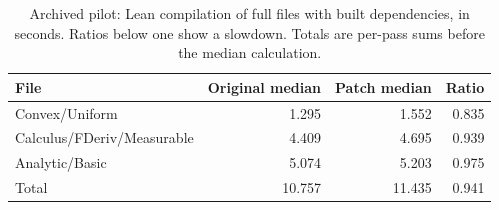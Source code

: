 \begin{table}[t]
\centering\small
\caption{Archived pilot: Lean compilation of full files with built dependencies, in seconds. Ratios below one show a slowdown. Totals are per-pass sums before the median calculation.}
\label{tab:pilot}
\begin{tabular}{lrrr}\toprule
File & Original median & Patch median & Ratio\\\midrule
Convex/Uniform & 1.295 & 1.552 & 0.835\\
Calculus/FDeriv/Measurable & 4.409 & 4.695 & 0.939\\
Analytic/Basic & 5.074 & 5.203 & 0.975\\
Total & 10.757 & 11.435 & 0.941\\\bottomrule\end{tabular}\end{table}
